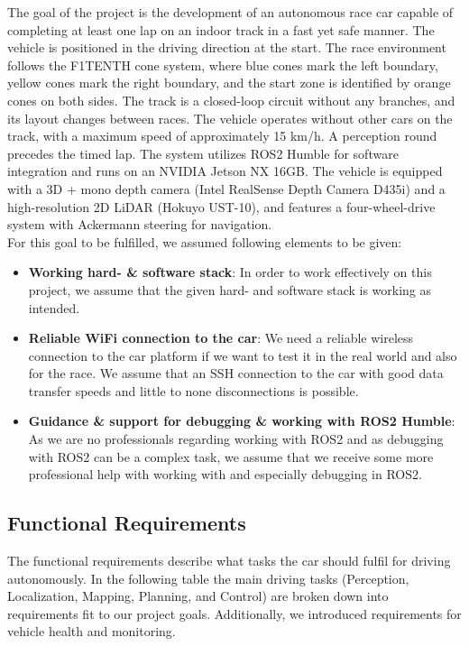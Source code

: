 The goal of the project is the development of an autonomous race car capable of completing at least one lap on an indoor track in a fast yet safe manner.
The vehicle is positioned in the driving direction at the start. The race environment follows the F1TENTH cone system, where blue cones mark the left boundary, yellow cones mark the right boundary, and the start zone is identified by orange cones on both sides.
The track is a closed-loop circuit without any branches, and its layout changes between races. The vehicle operates without other cars on the track, with a maximum speed of approximately 15 km/h. 
A perception round precedes the timed lap. The system utilizes ROS2 Humble for software integration and runs on an NVIDIA Jetson NX 16GB. The vehicle is equipped with a 3D + mono depth camera (Intel RealSense Depth Camera D435i) and a high-resolution 2D LiDAR (Hokuyo UST-10), and features a four-wheel-drive system with Ackermann steering for navigation. \\
\newline
For this goal to be fulfilled, we assumed following elements to be given:
\newline
\begin{itemize}
	\item \textbf{Working hard- \& software stack}: In order to work effectively on this project, we assume that the given hard- and software stack is working as intended. 
	\item \textbf{Reliable WiFi connection to the car}: We need a reliable wireless connection to the car platform if we want to test it in the real world and also for the race. We assume that an SSH connection to the car with good data transfer speeds and little to none disconnections is possible.
	\item \textbf{Guidance \& support for debugging \& working with ROS2 Humble}: As we are no professionals regarding working with ROS2 and as debugging with ROS2 can be a complex task, we assume that we receive some more professional help with working with and especially debugging in ROS2.
\end{itemize}

\subsection{Functional Requirements}

The functional requirements describe what tasks the car should fulfil for driving autonomously. In the following table the main driving tasks (Perception, Localization, Mapping, Planning, and Control) are broken down into requirements fit to our project goals. Additionally, we introduced requirements for vehicle health and monitoring.

